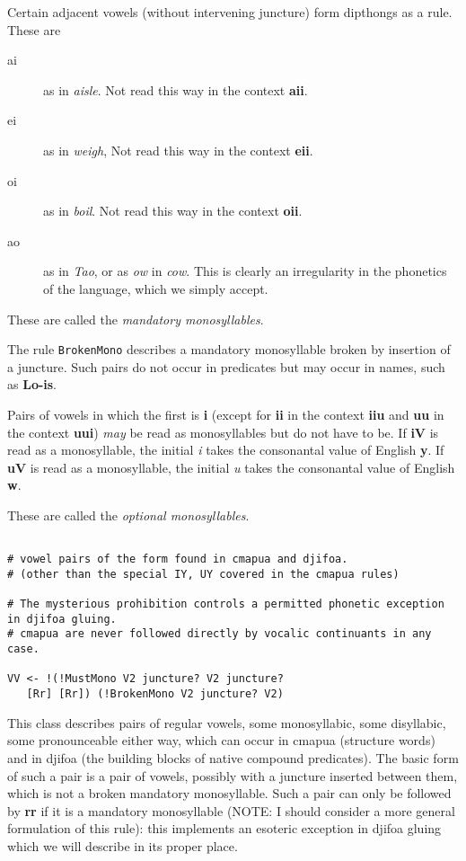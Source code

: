 \documentclass{article}
\begin{document}
Certain adjacent vowels (without intervening juncture) form dipthongs as a rule.  These are

\begin{description}

\item[ai]   as in {\em aisle\/}.   Not read this way in the context {\bf aii}.

\item[ei]  as in {\em weigh\/},  Not read this way in the context {\bf eii}.

\item[oi]  as in {\em boil\/}.  Not read this way in the context {\bf oii}.

\item[ao]  as in {\em Tao}, or as {\em ow\/} in {\em cow\/}.  This is clearly an irregularity in the phonetics of the language, which we simply accept.

\end{description}

These are called the {\em mandatory monosyllables\/}.

The rule {\tt BrokenMono} describes a mandatory monosyllable broken by insertion of a juncture.  Such pairs do not occur in predicates but may occur in names,
such as {\bf Lo-is}.

Pairs of vowels in which the first is {\bf i} (except for {\bf ii} in the context {\bf iiu} and {\bf uu} in the context {\bf uui}) {\em may\/} be read as monosyllables
but do not have to be.  If {\bf iV} is read as a monosyllable, the initial {\em i} takes the consonantal value of English {\bf y}.  If {\bf uV} is read as a monosyllable, the initial {\em u} takes the consonantal value of English {\bf w}.

These are called the {\em optional monosyllables\/}.

\begin{verbatim}

# vowel pairs of the form found in cmapua and djifoa.
# (other than the special IY, UY covered in the cmapua rules)

# The mysterious prohibition controls a permitted phonetic exception in djifoa gluing.
# cmapua are never followed directly by vocalic continuants in any case.

VV <- !(!MustMono V2 juncture? V2 juncture? 
   [Rr] [Rr]) (!BrokenMono V2 juncture? V2)

\end{verbatim}

This class describes pairs of regular vowels, some monosyllabic, some disyllabic, some pronounceable either way, which can occur in cmapua (structure words)
and in djifoa (the building blocks of native compound predicates).  The basic form of such a pair is a pair of vowels, possibly with a juncture inserted between them, which is not a broken mandatory monosyllable.  Such a pair can only be followed by {\bf rr} if it is a mandatory monosyllable (NOTE:  I should consider a more general formulation of this rule):  this implements an esoteric exception in djifoa gluing which we will describe in its proper place.
\end{document}
